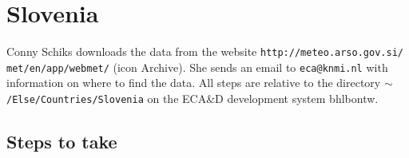 \documentclass[a4paper]{article}
\begin{document}

\section{Slovenia}

Conny Schiks downloads the data from the website
\texttt{http://meteo.arso.gov.si/ met/en/app/webmet/} (icon
Archive). She sends an email to \texttt{eca@knmi.nl} with information
on where to find the data. All steps are relative to the directory
\texttt{$\sim$/Else/Countries/Slovenia} on the ECA\&D development
system bhlbontw.

\subsection*{Steps to take}
\end{document}
